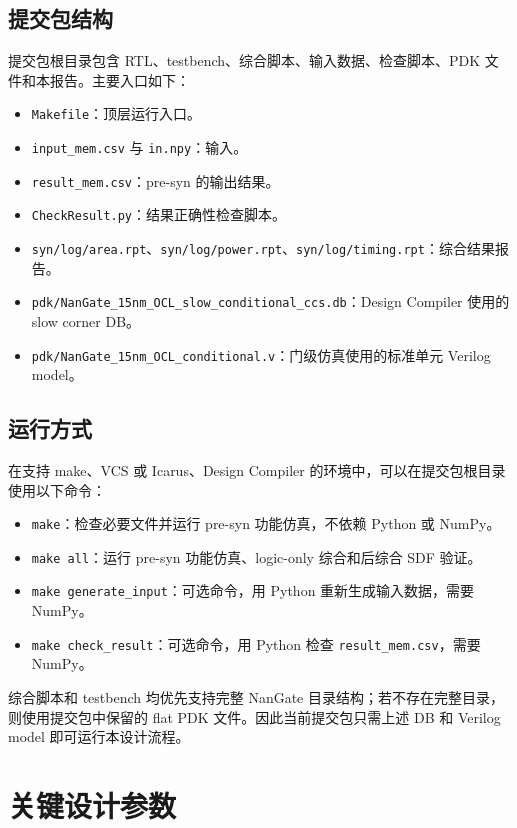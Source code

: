 \documentclass[UTF8,a4paper,zihao=-4]{ctexart}
\begin{document}
\subsection{提交包结构}
提交包根目录包含 RTL、testbench、综合脚本、输入数据、检查脚本、PDK 文件和本报告。主要入口如下：
\begin{itemize}
  \item \texttt{Makefile}：顶层运行入口。
  \item \texttt{input\_mem.csv} 与 \texttt{in.npy}：输入。
  \item \texttt{result\_mem.csv}：pre-syn 的输出结果。
  \item \texttt{CheckResult.py}：结果正确性检查脚本。
  \item \texttt{syn/log/area.rpt}、\texttt{syn/log/power.rpt}、\texttt{syn/log/timing.rpt}：综合结果报告。
  \item \texttt{pdk/NanGate\_15nm\_OCL\_slow\_conditional\_ccs.db}：Design Compiler 使用的 slow corner DB。
  \item \texttt{pdk/NanGate\_15nm\_OCL\_conditional.v}：门级仿真使用的标准单元 Verilog model。
\end{itemize}
\subsection{运行方式}
在支持 make、VCS 或 Icarus、Design Compiler 的环境中，可以在提交包根目录使用以下命令：
\begin{itemize}
  \item \texttt{make}：检查必要文件并运行 pre-syn 功能仿真，不依赖 Python 或 NumPy。
  \item \texttt{make all}：运行 pre-syn 功能仿真、logic-only 综合和后综合 SDF 验证。
  \item \texttt{make generate\_input}：可选命令，用 Python 重新生成输入数据，需要 NumPy。
  \item \texttt{make check\_result}：可选命令，用 Python 检查 \texttt{result\_mem.csv}，需要 NumPy。
\end{itemize}

综合脚本和 testbench 均优先支持完整 NanGate 目录结构；若不存在完整目录，则使用提交包中保留的 flat PDK 文件。因此当前提交包只需上述 DB 和 Verilog model 即可运行本设计流程。

\section{关键设计参数}
\end{document}

